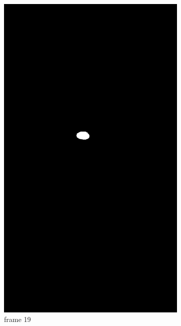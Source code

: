 \documentclass[12pt,a4paper]{article}
\begin{document}
\begin{figure}[htb]
\begin{subfigure}[h!]{0.3\textwidth}
		\includegraphics[width=\textwidth]{7296/18.png}
		\caption{frame 19}
	\end{subfigure}
	\begin{subfigure}[h!]{0.3\textwidth}
		\centering

\end{subfigure}
\end{figure}
\end{document}

